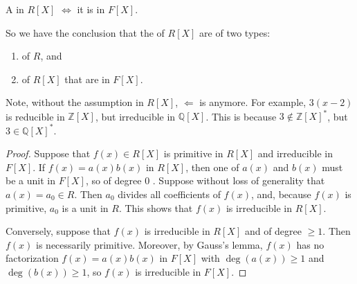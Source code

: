 \documentclass{article}
\begin{document}
\begin{cora}\label{cor:ineqead}A  in $R[X]$ $\Longleftrightarrow$ it is  in $F[X]$.

So we have the conclusion that the  of $R[X]$ are of two types:
\begin{enumerate}
    \item {} of $R$, and
    \item  {} of $R[X]$ that are  in $F[X]$.
\end{enumerate}  
\end{cora}
\begin{rema}
Note, without the assumption  in $R[X]$, $\Leftarrow$ is anymore. For example,  $3(x-2)$ is reducible in $\mathbb{Z}[X]$, but irreducible in $\mathbb{Q}[X]$. This is because $3 \notin \mathbb{Z}[X]^{*}$, but $3 \in \mathbb{Q}[X]^{*}$. %
\end{rema}
\begin{proof}
Suppose that $f(x) \in R[X]$ is primitive in $R[X]$ and irreducible in $F[X]$. If $f(x)=a(x) b(x)$ in $R[X]$, then one of $a(x)$ and $b(x)$ must be a unit in $F[X]$, so of degree 0 . Suppose without loss of generality that $a(x)=a_{0} \in R$. Then $a_{0}$ divides all coefficients of $f(x)$, and, because $f(x)$ is primitive, $a_{0}$ is a unit in $R$. This shows that $f(x)$ is irreducible in $R[X]$.

Conversely, suppose that $f(x)$ is irreducible in $R[X]$ and of degree $\geq 1$. Then $f(x)$ is necessarily primitive. Moreover, by Gauss's lemma, $f(x)$ has no factorization $f(x)=a(x) b(x)$ in $F[X]$ with $\operatorname{deg}(a(x)) \geq 1$ and $\operatorname{deg}(b(x)) \geq 1$, so $f(x)$ is irreducible in $F[X]$.
\end{proof}
\end{document}
